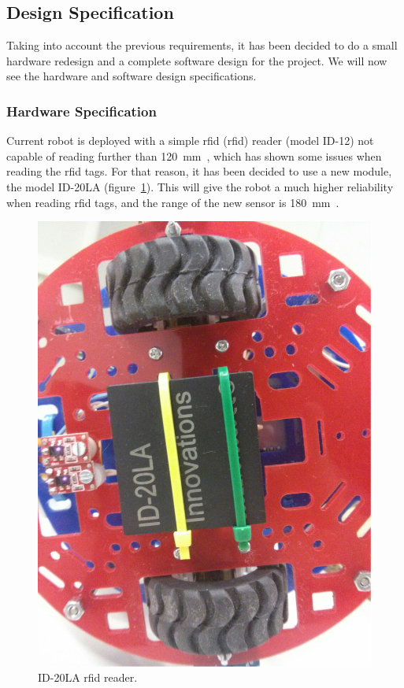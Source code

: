 \subsection{Design Specification}

Taking into account the previous requirements, it has been decided to do a small hardware redesign
and a complete software design for the project. We will now see the hardware and software design
specifications.

\subsubsection{Hardware Specification}

Current robot is deployed with a simple \acrshort{rfid} (\acrlong{rfid}) reader (model ID-12) not
capable of reading further than 120~mm~\cite{rfid}, which has shown some issues when reading the
\acrshort{rfid} tags. For that reason, it has been decided to use a new module, the model ID-20LA
(figure~\ref{fig:rfid}). This will give the robot a much higher reliability when reading
\acrshort{rfid} tags, and the range of the new sensor is 180~mm~\cite{rfid}.

\begin{figure}[!htbp]
	\centering
	\includegraphics[width=0.3\textheight, angle=-90]{fig/rfid}
	\caption{ID-20LA \acrshort{rfid} reader.}
	\label{fig:rfid}
\end{figure}

